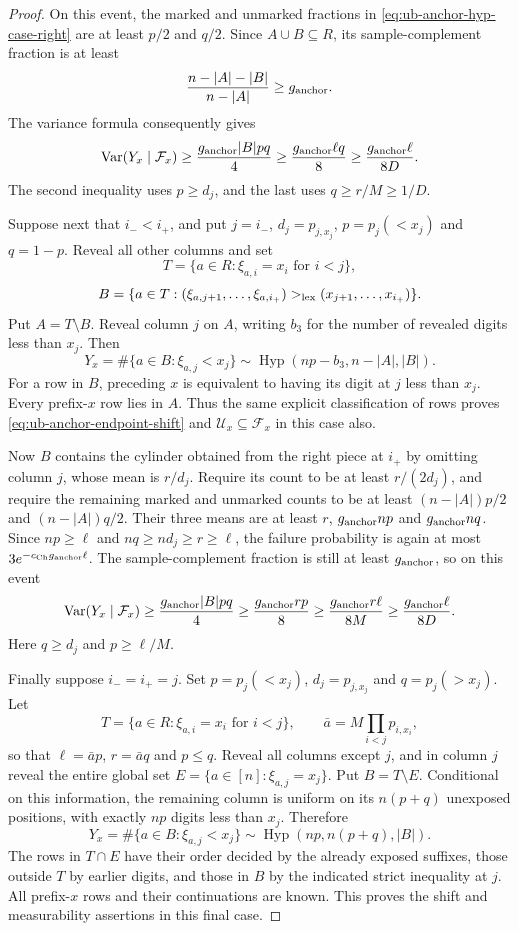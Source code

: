 \documentclass[11pt]{article}
\numberwithin{equation}{section}
\newcommand{\Var}{\operatorname{Var}}
\newcommand{\1}{\mathbf 1}
\begin{document}
\begin{proof}
On this event, the marked and unmarked fractions in
\eqref{eq:ub-anchor-hyp-case-right} are at least $p/2$ and $q/2$.
Since $A\cup B\subseteq R$, its sample-complement fraction is at least
\[
 \frac{n-|A|-|B|}{n-|A|}\ge g_{\rm anchor}.
\]
The variance formula consequently gives
\[
 \Var(Y_x\mid\mathcal F_x)
 \ge\frac{g_{\rm anchor}|B|pq}{4}
 \ge\frac{g_{\rm anchor}\ell q}{8}
 \ge\frac{g_{\rm anchor}\ell}{8D}.
\]
The second inequality uses $p\ge d_j$, and the last uses
$q\ge r/M\ge1/D$.

Suppose next that $i_-<i_+$, and put $j=i_-$,
$d_j=p_{j,x_j}$, $p=p_j(<x_j)$ and $q=1-p$.
Reveal all other columns and set
\[
 T=\{a\in R:\xi_{a,i}=x_i\text{ for }i<j\},
\]
\[
 B=\{a\in T:(\xi_{a,j+1},\ldots,\xi_{a,i_+})
                    >_{\rm lex}(x_{j+1},\ldots,x_{i_+})\}.
\]
Put $A=T\setminus B$.  Reveal column $j$ on $A$, writing $b_3$ for the number of revealed
digits less than $x_j$.  Then
\begin{equation}
\label{eq:ub-anchor-hyp-case-left}
 Y_x=\#\{a\in B:\xi_{a,j}<x_j\}
 \sim\operatorname{Hyp}(np-b_3,n-|A|,|B|).
\end{equation}
For a row in $B$, preceding $x$ is equivalent to having its digit at
$j$ less than $x_j$.  Every prefix-$x$ row lies in $A$.  Thus the
same explicit classification of rows proves
\eqref{eq:ub-anchor-endpoint-shift} and
$\mathcal U_x\subseteq\mathcal F_x$ in this case also.

Now $B$ contains the cylinder obtained from the right piece at $i_+$
by omitting column $j$, whose mean is $r/d_j$.  Require its count to
be at least $r/(2d_j)$, and require the remaining marked and unmarked
counts to be at least $(n-|A|)p/2$ and $(n-|A|)q/2$.
Their three means are at least $r$, $g_{\rm anchor}np$ and
$g_{\rm anchor}nq$.  Since $np\ge\ell$ and
$nq\ge nd_j\ge r\ge\ell$, the failure probability is again at most
$3e^{-c_{\rm Ch}g_{\rm anchor}\ell}$.
The sample-complement fraction is still at least $g_{\rm anchor}$,
so on this event
\[
 \Var(Y_x\mid\mathcal F_x)
 \ge\frac{g_{\rm anchor}|B|pq}{4}
 \ge\frac{g_{\rm anchor}rp}{8}
 \ge\frac{g_{\rm anchor}r\ell}{8M}
 \ge\frac{g_{\rm anchor}\ell}{8D}.
\]
Here $q\ge d_j$ and $p\ge\ell/M$.

Finally suppose $i_-=i_+=j$.  Set
$p=p_j(<x_j)$, $d_j=p_{j,x_j}$ and $q=p_j(>x_j)$.
Let
\[
 T=\{a\in R:\xi_{a,i}=x_i\text{ for }i<j\},\qquad
 \bar a=M\prod_{i<j}p_{i,x_i},
\]
so that $\ell=\bar a p$, $r=\bar a q$ and $p\le q$.
Reveal all columns except $j$, and in column $j$ reveal the entire
global set $E=\{a\in[n]:\xi_{a,j}=x_j\}$.  Put $B=T\setminus E$.
Conditional on this information, the remaining column is uniform
on its $n(p+q)$ unexposed positions, with exactly $np$ digits less
than $x_j$.  Therefore
\begin{equation}
\label{eq:ub-anchor-hyp-case-equal}
 Y_x=\#\{a\in B:\xi_{a,j}<x_j\}
 \sim\operatorname{Hyp}(np,n(p+q),|B|).
\end{equation}
The rows in $T\cap E$ have their order decided by the already exposed
suffixes, those outside $T$ by earlier digits, and those in $B$ by
the indicated strict inequality at $j$.  All prefix-$x$ rows and their
continuations are known.  This proves the shift and measurability
assertions in this final case.


\end{proof}
\end{document}
